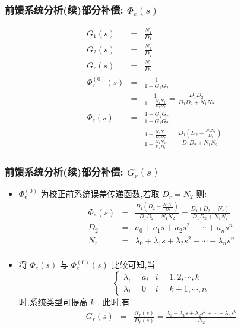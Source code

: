 \documentclass[table]{article}
\begin{document}
\begin{frame}
\frametitle{前馈系统分析(续)部分补偿: $\Phi_e(s)$}
\label{sec-4-3-7}

\begin{eqnarray*}
G_1(s) &=  &\frac{N_1}{D_1} \\
G_2(s) &=  &\frac{N_2}{D_2} \\
G_r(s) &=  &\frac{N_r}{D_r} \\
\Phi_e^{(0)}(s) &=& \frac{1}{1+G_1G_2} \\
&=& \frac{1}{1+\frac{N_1N_2}{D_1D_2}} 
= \frac{D_1D_2}{D_1D_2+N_1N_2} \\
\Phi_e(s) &=& \frac{1-G_2G_r}{1+G_1G_2} \\
 &=& \frac{1-\frac{N_2N_r}{D_2D_r}}{1+\frac{N_1N_2}{D_1D_2}} 
 = \frac{D_1(D_2-\frac{N_2N_r}{D_r})}{D_1D_2+N_1N_2} 
\end{eqnarray*}
\end{frame}
\begin{frame}
\frametitle{前馈系统分析(续)部分补偿: $G_r(s)$}
\label{sec-4-3-8}

\begin{itemize}
\item $\Phi_e^{(0)}$  为校正前系统误差传递函数,若取  $D_r=N_2$  则:
      \begin{eqnarray*}
      \Phi_e(s) &=& \frac{D_1(D_2-\frac{N_2N_r}{D_r})}{D_1D_2+N_1N_2} 
		 =\frac{D_1(D_2-N_r)}{D_1D_2+N_1N_2} \\
      D_2 &=& a_0+a_1 s+ a_2 s^2+\cdots+a_n s^n \\
      N_r &=& \lambda_0+\lambda_1 s+\lambda_2 s^2 +\cdots +\lambda_n s^n \\
      \end{eqnarray*}
\item <2-> 将  $\Phi_e(s)$  与  $\Phi_e^{(0)}(s)$  比较可知,当 
      \begin{equation}
      \begin{cases}
      \lambda_i=a_i & i=1,2,\cdots,k \\
      \lambda_i=0 & i=k+1,\cdots ,n 
      \end{cases}
      \end{equation}
     时,系统类型可提高  $k$ . 此时,有:
      \begin{eqnarray*}
      G_r(s) &=& \frac{N_r(s)}{D_r(s)} 
      = \frac{\lambda_0+\lambda_1 s+\lambda_2 s^2 +\cdots +\lambda_n s^k}{N_2} 
      \end{eqnarray*}
\end{itemize}
\end{frame}
\end{document}
